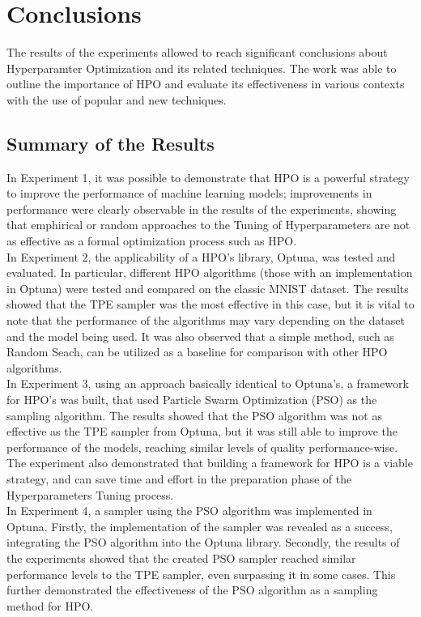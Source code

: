 \chapter{Conclusions}

The results of the experiments allowed to reach significant conclusions about Hyperparamter Optimization and its related techniques. The work was able to outline the importance of HPO and evaluate its effectiveness in various contexts with the use of popular and new techniques.

\section{Summary of the Results}

In Experiment 1, it was possible to demonstrate that HPO is a powerful strategy to improve the performance of machine learning models; improvements in performance were clearly observable in the results of the experiments, showing that emphirical or random approaches to the Tuning of Hyperparameters are not as effective as a formal optimization process such as HPO.
\\[0.3cm]In Experiment 2, the applicability of a HPO's library, Optuna, was tested and evaluated. In particular, different HPO algorithms (those with an implementation in Optuna) were tested and compared on the classic MNIST dataset. The results showed that the TPE sampler was the most effective in this case, but it is vital to note that the performance of the algorithms may vary depending on the dataset and the model being used. It was also observed that a simple method, such as Random Seach, can be utilized as a baseline for comparison with other HPO algorithms.
\\[0.3cm]In Experiment 3, using an approach basically identical to Optuna's, a framework for HPO's was built, that used Particle Swarm Optimization (PSO) as the sampling algorithm. The results showed that the PSO algorithm was not as effective as the TPE sampler from Optuna, but it was still able to improve the performance of the models, reaching similar levels of quality performance-wise. The experiment also demonstrated that building a framework for HPO is a viable strategy, and can save time and effort in the preparation phase of the Hyperparameters Tuning process.
\\[0.3cm]In Experiment 4, a sampler using the PSO algorithm was implemented in Optuna. Firstly, the implementation of the sampler was revealed as a success, integrating the PSO algorithm into the Optuna library. Secondly, the results of the experiments showed that the created PSO sampler reached similar performance levels to the TPE sampler, even surpassing it in some cases. This further demonstrated the effectiveness of the PSO algorithm as a sampling method for HPO.
